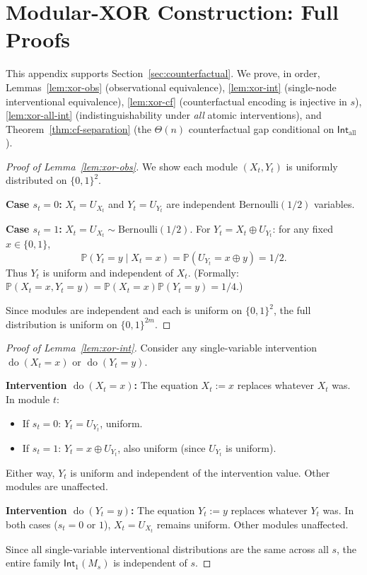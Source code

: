 \documentclass{article}
\theoremstyle{plain}
\theoremstyle{definition}
\newcommand{\Prob}{\mathbb{P}}
\newcommand{\Int}{\mathsf{Int}}
\DeclareMathOperator{\doop}{do}
\begin{document}
\section{Modular-XOR Construction: Full Proofs}
\label{app:xor-proofs}

This appendix supports Section~\ref{sec:counterfactual}. We prove, in order, Lemmas~\ref{lem:xor-obs} (observational equivalence), \ref{lem:xor-int} (single-node interventional equivalence), \ref{lem:xor-cf} (counterfactual encoding is injective in $s$), \ref{lem:xor-all-int} (indistinguishability under \emph{all} atomic interventions), and Theorem~\ref{thm:cf-separation} (the $\Theta(n)$ counterfactual gap conditional on $\Int_{\mathrm{all}}$).

\begin{proof}[Proof of Lemma~\ref{lem:xor-obs}]
We show each module $(X_t, Y_t)$ is uniformly distributed on $\{0,1\}^2$.

\textbf{Case $s_t = 0$:} $X_t = U_{X_t}$ and $Y_t = U_{Y_t}$ are independent $\mathrm{Bernoulli}(1/2)$ variables.

\textbf{Case $s_t = 1$:} $X_t = U_{X_t} \sim \mathrm{Bernoulli}(1/2)$. For $Y_t = X_t \oplus U_{Y_t}$: for any fixed $x \in \{0,1\}$,
\[
\Prob(Y_t = y \mid X_t = x) = \Prob(U_{Y_t} = x \oplus y) = 1/2.
\]
Thus $Y_t$ is uniform and independent of $X_t$. (Formally: $\Prob(X_t = x, Y_t = y) = \Prob(X_t = x) \Prob(Y_t = y) = 1/4$.)

Since modules are independent and each is uniform on $\{0,1\}^2$, the full distribution is uniform on $\{0,1\}^{2m}$.
\end{proof}

\begin{proof}[Proof of Lemma~\ref{lem:xor-int}]
Consider any single-variable intervention $\doop(X_t = x)$ or $\doop(Y_t = y)$.

\textbf{Intervention $\doop(X_t = x)$:} The equation $X_t := x$ replaces whatever $X_t$ was. In module $t$:
\begin{itemize}
    \item If $s_t = 0$: $Y_t = U_{Y_t}$, uniform.
    \item If $s_t = 1$: $Y_t = x \oplus U_{Y_t}$, also uniform (since $U_{Y_t}$ is uniform).
\end{itemize}
Either way, $Y_t$ is uniform and independent of the intervention value. Other modules are unaffected.

\textbf{Intervention $\doop(Y_t = y)$:} The equation $Y_t := y$ replaces whatever $Y_t$ was. In both cases ($s_t = 0$ or $1$), $X_t = U_{X_t}$ remains uniform. Other modules unaffected.

Since all single-variable interventional distributions are the same across all $s$, the entire family $\Int_1(M_s)$ is independent of $s$.
\end{proof}
\end{document}
